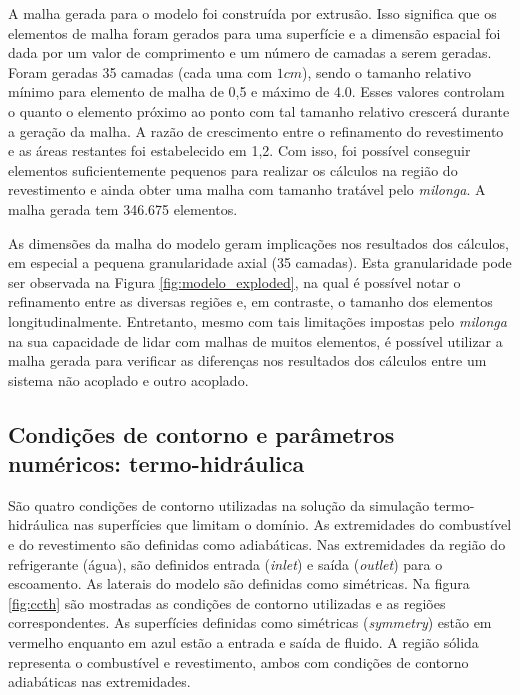 A malha gerada para o modelo foi construída por extrusão. Isso significa que
os elementos de malha foram gerados para uma superfície e a dimensão espacial
foi dada por um valor de comprimento e um número de camadas a serem geradas.
Foram geradas 35 camadas (cada uma com $1 cm$), sendo o tamanho relativo
mínimo para elemento de malha de 0,5 e máximo de 4.0. Esses valores controlam
o quanto o elemento próximo ao ponto com tal tamanho relativo crescerá durante
a geração da malha. A razão de crescimento entre o refinamento do revestimento
e as áreas restantes foi estabelecido em 1,2. Com isso, foi possível conseguir
elementos suficientemente pequenos para realizar os cálculos na região
do revestimento e ainda obter uma malha com tamanho tratável pelo \textit{milonga}.
A malha gerada tem 346.675 elementos.

As dimensões da malha do modelo geram implicações nos resultados dos cálculos, em
especial a pequena granularidade axial (35 camadas). Esta granularidade
pode ser observada na Figura \ref{fig:modelo_exploded},
na qual é possível notar
o refinamento entre as diversas regiões e, em contraste, o tamanho dos elementos longitudinalmente.
Entretanto, mesmo com tais
limitações impostas pelo \textit{milonga} na sua capacidade de lidar
com malhas de muitos elementos, é possível utilizar a malha gerada para verificar
as diferenças nos resultados dos cálculos entre um sistema não acoplado e outro acoplado.


\subsection{Condições de contorno e parâmetros numéricos: termo-hidráulica}
\label{subsec:ccth}


São quatro condições de contorno utilizadas na solução da simulação termo-hidráulica
nas superfícies que limitam o domínio. As extremidades do combustível e do revestimento
são definidas como adiabáticas. Nas
extremidades da região do refrigerante (água), são definidos entrada (\textit{inlet}) e
saída (\textit{outlet}) para o escoamento. As laterais do modelo são definidas
como simétricas. Na figura \ref{fig:ccth} são mostradas as condições de contorno
utilizadas e as regiões correspondentes. As superfícies definidas como simétricas (\textit{symmetry})
estão em vermelho
enquanto em azul estão a entrada e saída de fluido. A região sólida representa o
combustível e revestimento, ambos com condições de contorno adiabáticas nas extremidades.

